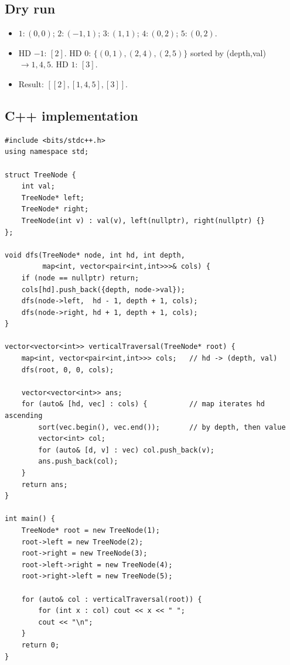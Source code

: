 \subsection*{Dry run}


\begin{itemize}
  \item $1:(0,0)$; $2:(-1,1)$; $3:(1,1)$; $4:(0,2)$; $5:(0,2)$.
  \item HD $-1$: $[2]$. HD $0$: $\{(0,1),(2,4),(2,5)\}$ sorted by
        (depth,val) $\to 1,4,5$. HD $1$: $[3]$.
  \item Result: $[[2],[1,4,5],[3]]$.
\end{itemize}

\subsection*{C++ implementation}

\begin{lstlisting}
#include <bits/stdc++.h>
using namespace std;

struct TreeNode {
    int val;
    TreeNode* left;
    TreeNode* right;
    TreeNode(int v) : val(v), left(nullptr), right(nullptr) {}
};

void dfs(TreeNode* node, int hd, int depth,
         map<int, vector<pair<int,int>>>& cols) {
    if (node == nullptr) return;
    cols[hd].push_back({depth, node->val});
    dfs(node->left,  hd - 1, depth + 1, cols);
    dfs(node->right, hd + 1, depth + 1, cols);
}

vector<vector<int>> verticalTraversal(TreeNode* root) {
    map<int, vector<pair<int,int>>> cols;   // hd -> (depth, val)
    dfs(root, 0, 0, cols);

    vector<vector<int>> ans;
    for (auto& [hd, vec] : cols) {          // map iterates hd ascending
        sort(vec.begin(), vec.end());       // by depth, then value
        vector<int> col;
        for (auto& [d, v] : vec) col.push_back(v);
        ans.push_back(col);
    }
    return ans;
}

int main() {
    TreeNode* root = new TreeNode(1);
    root->left = new TreeNode(2);
    root->right = new TreeNode(3);
    root->left->right = new TreeNode(4);
    root->right->left = new TreeNode(5);

    for (auto& col : verticalTraversal(root)) {
        for (int x : col) cout << x << " ";
        cout << "\n";
    }
    return 0;
}
\end{lstlisting}

